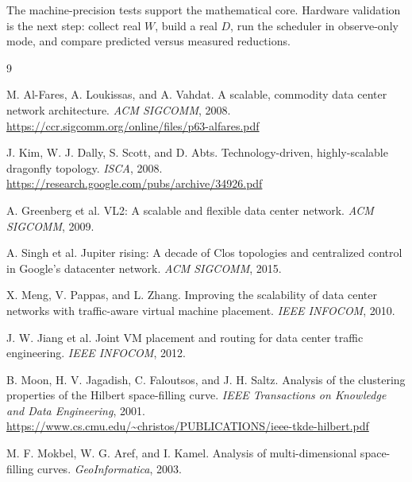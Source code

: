 \documentclass[11pt]{article}
\theoremstyle{remark}
\begin{document}
The machine-precision tests support the mathematical core. Hardware validation is the next step: collect real $W$, build a real $D$, run the scheduler in observe-only mode, and compare predicted versus measured reductions.

\begin{thebibliography}{9}

M. Al-Fares, A. Loukissas, and A. Vahdat.
\newblock A scalable, commodity data center network architecture.
\newblock \emph{ACM SIGCOMM}, 2008.
\newblock \url{https://ccr.sigcomm.org/online/files/p63-alfares.pdf}

J. Kim, W. J. Dally, S. Scott, and D. Abts.
\newblock Technology-driven, highly-scalable dragonfly topology.
\newblock \emph{ISCA}, 2008.
\newblock \url{https://research.google.com/pubs/archive/34926.pdf}

A. Greenberg et al.
\newblock VL2: A scalable and flexible data center network.
\newblock \emph{ACM SIGCOMM}, 2009.

A. Singh et al.
\newblock Jupiter rising: A decade of Clos topologies and centralized control in Google's datacenter network.
\newblock \emph{ACM SIGCOMM}, 2015.

X. Meng, V. Pappas, and L. Zhang.
\newblock Improving the scalability of data center networks with traffic-aware virtual machine placement.
\newblock \emph{IEEE INFOCOM}, 2010.

J. W. Jiang et al.
\newblock Joint VM placement and routing for data center traffic engineering.
\newblock \emph{IEEE INFOCOM}, 2012.

B. Moon, H. V. Jagadish, C. Faloutsos, and J. H. Saltz.
\newblock Analysis of the clustering properties of the Hilbert space-filling curve.
\newblock \emph{IEEE Transactions on Knowledge and Data Engineering}, 2001.
\newblock \url{https://www.cs.cmu.edu/~christos/PUBLICATIONS/ieee-tkde-hilbert.pdf}

M. F. Mokbel, W. G. Aref, and I. Kamel.
\newblock Analysis of multi-dimensional space-filling curves.
\newblock \emph{GeoInformatica}, 2003.

\end{thebibliography}
\end{document}
